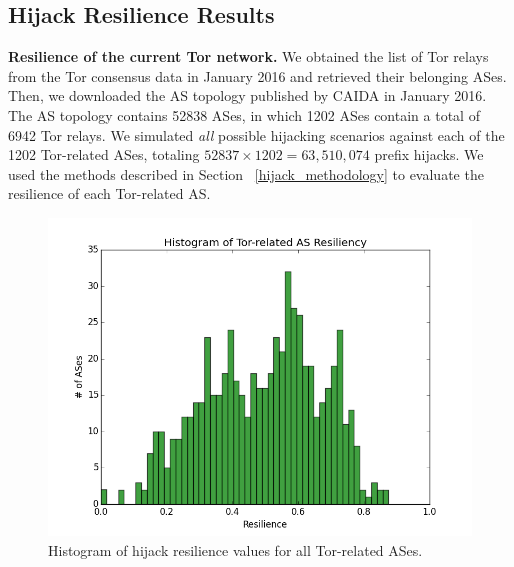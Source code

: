 
\subsection{Hijack Resilience Results}

{\bf Resilience of the current Tor network.} We obtained the list of Tor relays from the Tor consensus data in January 2016 and retrieved their belonging ASes. Then, we downloaded the AS topology published by CAIDA in January 2016. The AS topology contains 52838 ASes, in which 1202 ASes contain a total of 6942 Tor relays. We simulated \emph{all} possible hijacking scenarios against each of the 1202 Tor-related ASes, totaling $52837 \times 1202 = 63,510,074$ prefix hijacks. We used the methods described in Section ~\ref{hijack_methodology} to evaluate the resilience of each Tor-related AS. 

\begin{figure}[ht!]
\centering
\includegraphics[width=.4\textwidth]{resilience_histogram}
\caption{Histogram of hijack resilience values for all Tor-related ASes.}
\label{fig:hijack_resilience_histogram}
\end{figure}

